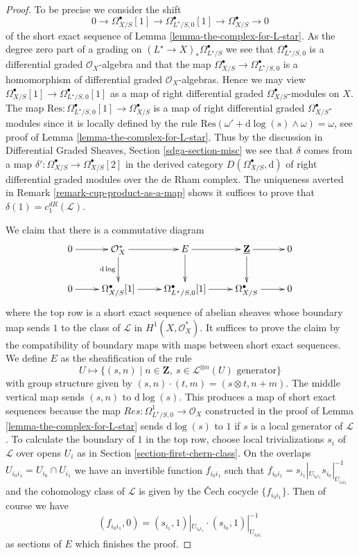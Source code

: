 \documentclass[10pt,a4paper]{amsart}
\theoremstyle{plain}
\theoremstyle{definition}
\theoremstyle{remark}
\numberwithin{equation}{subsection}
\begin{document}
\begin{proof}
To be precise we consider the shift
$$
0 \to \Omega^\bullet_{X/S}[1] \to
\Omega^\bullet_{L^\star/S, 0}[1] \to
\Omega^\bullet_{X/S} \to 0
$$
of the short exact sequence of Lemma \ref{lemma-the-complex-for-L-star}.
As the degree zero part of a grading on
$(L^\star \to X)_*\Omega^\bullet_{L^\star/S}$
we see that $\Omega^\bullet_{L^\star/S, 0}$ is a differential
graded $\mathcal{O}_X$-algebra and that the map
$\Omega^\bullet_{X/S} \to \Omega^\bullet_{L^\star/S, 0}$
is a homomorphism of differential graded $\mathcal{O}_X$-algebras.
Hence we may view $\Omega^\bullet_{X/S}[1] \to
\Omega^\bullet_{L^\star/S, 0}[1]$ as a map of right differential graded
$\Omega^\bullet_{X/S}$-modules on $X$. The map
$\text{Res} : \Omega^\bullet_{L^\star/S, 0}[1] \to \Omega^\bullet_{X/S}$
is a map of right differential graded $\Omega^\bullet_{X/S}$-modules
since it is locally defined by the rule
$\text{Res}(\omega' + \text{d}\log(s) \wedge \omega) = \omega$, see
proof of Lemma \ref{lemma-the-complex-for-L-star}.
Thus by the discussion in
Differential Graded Sheaves, Section \ref{sdga-section-misc}
we see that $\delta$ comes from a map
$\delta' : \Omega^\bullet_{X/S} \to \Omega^\bullet_{X/S}[2]$
in the derived category $D(\Omega^\bullet_{X/S}, \text{d})$
of right differential graded modules over the de Rham complex.
The uniqueness averted in Remark \ref{remark-cup-product-as-a-map}
shows it suffices to prove that $\delta(1) = c_1^{dR}(\mathcal{L})$.

\medskip\noindent
We claim that there is a commutative diagram
$$
\xymatrix{
0 \ar[r] &
\mathcal{O}_X^* \ar[r] \ar[d]_{\text{d}\log} &
E \ar[r] \ar[d] &
\underline{\mathbf{Z}} \ar[d] \ar[r] &
0 \\
0 \ar[r] &
\Omega^\bullet_{X/S}[1] \ar[r] &
\Omega^\bullet_{L^\star/S, 0}[1] \ar[r] &
\Omega^\bullet_{X/S} \ar[r] &
0
}
$$
where the top row is a short exact sequence of abelian sheaves whose
boundary map sends $1$ to the class of $\mathcal{L}$ in
$H^1(X, \mathcal{O}_X^*)$. It suffices to prove the claim
by the compatibility of boundary maps with maps between short
exact sequences. We define $E$ as the sheafification of the rule
$$
U \longmapsto \{(s, n) \mid
n \in \mathbf{Z},\ s \in \mathcal{L}^{\otimes n}(U)\text{ generator}\}
$$
with group structure given by $(s, n) \cdot (t, m) = (s \otimes t, n + m)$.
The middle vertical map sends $(s, n)$ to $\text{d}\log(s)$. This produces
a map of short exact sequences
because the map $Res : \Omega^1_{L^\star/S, 0} \to \mathcal{O}_X$
constructed in the proof of Lemma \ref{lemma-the-complex-for-L-star} sends
$\text{d}\log(s)$ to $1$ if $s$ is a local generator of $\mathcal{L}$.
To calculate the boundary of $1$ in the top row, choose local trivializations
$s_i$ of $\mathcal{L}$ over opens $U_i$ as in
Section \ref{section-first-chern-class}. On the overlaps
$U_{i_0i_1} = U_{i_0} \cap U_{i_1}$
we have an invertible function $f_{i_0i_1}$ such that
$f_{i_0i_1} = s_{i_1}|_{U_{i_0i_1}} s_{i_0}|_{U_{i_0i_1}}^{-1}$
and the cohomology class of $\mathcal{L}$ is given by the {\v C}ech cocycle
$\{f_{i_0i_1}\}$. Then of course we have
$$
(f_{i_0i_1}, 0) = (s_{i_1}, 1)|_{U_{i_0i_1}} \cdot
(s_{i_0}, 1)|_{U_{i_0i_1}}^{-1}
$$
as sections of $E$ which finishes the proof.
\end{proof}
\end{document}
